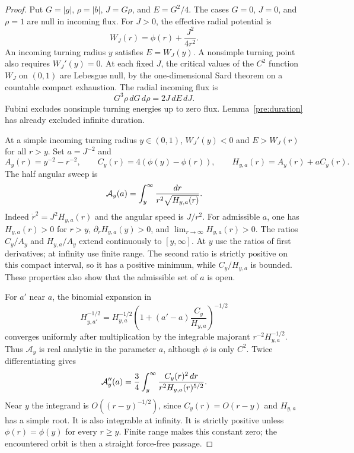 \begin{proof}
Put $G=|g|$, $\rho=|b|$, $J=G\rho$, and $E=G^2/4$.
The cases $G=0$, $J=0$, and $\rho=1$ are null in incoming flux.
For $J>0$, the effective radial potential is
\[
 W_J(r)=\phi(r)+\frac{J^2}{4r^2}.
\]
An incoming turning radius $y$ satisfies $E=W_J(y)$.
A nonsimple turning point also requires $W_J'(y)=0$.
At each fixed $J$, the critical values of the $C^2$ function $W_J$ on
$(0,1)$ are Lebesgue null, by the one-dimensional Sard theorem on a
countable compact exhaustion. The radial incoming flux is
\begin{equation}\label{eq:pre-Sardflux}
 G^3\rho\,dG\,d\rho=2J\,dE\,dJ.
\end{equation}
Fubini excludes nonsimple turning energies up to zero flux.
Lemma~\ref{pre:duration} has already excluded infinite duration.

At a simple incoming turning radius $y\in(0,1)$,
$W_J'(y)<0$ and $E>W_J(r)$ for all $r>y$.
Set $a=J^{-2}$ and
\[
 A_y(r)=y^{-2}-r^{-2},\qquad
 C_y(r)=4(\phi(y)-\phi(r)),\qquad
 H_{y,a}(r)=A_y(r)+aC_y(r).
\]
The half angular sweep is
\begin{equation}\label{eq:pre-halfangle}
 {\cal A}_y(a)=\int_y^\infty\frac{dr}{r^2\sqrt{H_{y,a}(r)}}.
\end{equation}
Indeed $\dot r^2=J^2H_{y,a}(r)$ and the angular speed is $J/r^2$.
For admissible $a$, one has $H_{y,a}(r)>0$ for $r>y$,
$\partial_rH_{y,a}(y)>0$, and
$\lim_{r\to\infty}H_{y,a}(r)>0$.
The ratios $C_y/A_y$ and $H_{y,a}/A_y$ extend continuously to
$[y,\infty]$. At $y$ use the ratios of first derivatives; at infinity
use finite range. The second ratio is strictly positive on this compact
interval, so it has a positive minimum, while $C_y/H_{y,a}$ is bounded.
These properties also show that the admissible set of $a$ is open.

For $a'$ near $a$, the binomial expansion in
\[
 H_{y,a'}^{-1/2}
 =H_{y,a}^{-1/2}
       \left(1+(a'-a)\frac{C_y}{H_{y,a}}\right)^{-1/2}
\]
converges uniformly after multiplication by the integrable majorant
$r^{-2}H_{y,a}^{-1/2}$. Thus $\mathcal A_y$ is real analytic in the
parameter $a$, although $\phi$ is only $C^2$.
Twice differentiating gives
\begin{equation}\label{eq:pre-convex}
 {\cal A}_y''(a)=\frac34
       \int_y^\infty\frac{C_y(r)^2\,dr}{r^2H_{y,a}(r)^{5/2}}.
\end{equation}
Near $y$ the integrand is $O((r-y)^{-1/2})$, since $C_y(r)=O(r-y)$
and $H_{y,a}$ has a simple root. It is also integrable at infinity.
It is strictly positive unless $\phi(r)=\phi(y)$ for every $r\geq y$.
Finite range makes this constant zero; the encountered orbit is then
a straight force-free passage.


\end{proof}
